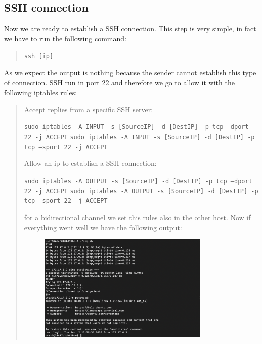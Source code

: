 \documentclass[11pt]{article}
\begin{document}
\subsection{SSH connection}
Now we are ready to establish a SSH connection. This step is very simple, in fact we have to run the following command:

\begin{quote}
  \texttt{ssh [ip]}\newline
\end{quote}

As we expect the output is nothing because the sender cannot establish this type of connection. SSH run in port 22 and therefore we go to allow it with the following iptables rules:

\begin{quote}
  Accept replies from a specific SSH server:

  \texttt{sudo iptables -A INPUT -s [SourceIP] -d [DestIP] -p tcp --dport 22 -j ACCEPT}\newline
  \texttt{sudo iptables -A INPUT -s [SourceIP] -d [DestIP] -p tcp --sport 22 -j ACCEPT}\newline

  Allow an ip to establish a SSH connection:

  \texttt{sudo iptables -A OUTPUT -s [SourceIP] -d [DestIP] -p tcp --dport 22 -j ACCEPT}\newline
  \texttt{sudo iptables -A OUTPUT -s [SourceIP] -d [DestIP] -p tcp --sport 22 -j ACCEPT}\newline

  for a bidirectional channel we set this rules also in the other host. Now if everything went well we have the following output:

  \begin{figure}[!ht]
    \centering
    \includegraphics[width=0.8\textwidth]{pic6-hw8-1635747}
    \label{fig:conf}
  \end{figure}
\end{quote}
\end{document}

